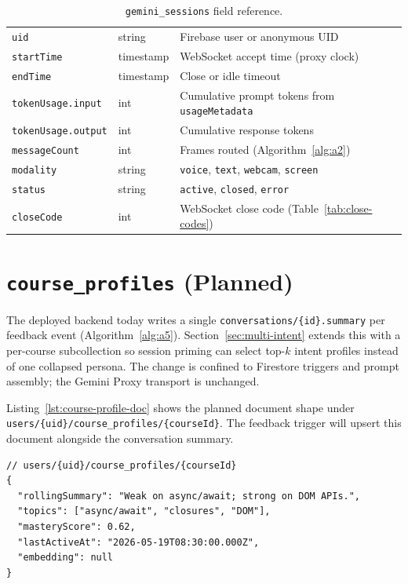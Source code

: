 \tablesetup
\begin{table}[H]
\centering
\caption{\texttt{gemini\_sessions} field reference.}
\label{tab:gemini-session-fields}
\small
\begin{tabular}{|p{3.0cm}|p{1.9cm}|p{8.3cm}|}
\hline
\chead{Field} & \chead{Type} & \chead{Semantics} \\
\hline
\texttt{uid} & string & Firebase user or anonymous UID \\
\texttt{startTime} & timestamp & WebSocket accept time (proxy clock) \\
\texttt{endTime} & timestamp & Close or idle timeout \\
\texttt{tokenUsage.input} & int & Cumulative prompt tokens from \texttt{usageMetadata} \\
\texttt{tokenUsage.output} & int & Cumulative response tokens \\
\texttt{messageCount} & int & Frames routed (Algorithm~\ref{alg:a2}) \\
\texttt{modality} & string & \texttt{voice}, \texttt{text}, \texttt{webcam}, \texttt{screen} \\
\texttt{status} & string & \texttt{active}, \texttt{closed}, \texttt{error} \\
\texttt{closeCode} & int & WebSocket close code (Table~\ref{tab:close-codes}) \\
\hline
\end{tabular}
\end{table}

\section{\texttt{course\_profiles} (Planned)}
\label{sec:course-profiles-impl}

The deployed backend today writes a single \texttt{conversations/\{id\}.summary} per feedback event (Algorithm~\ref{alg:a5}). Section~\ref{sec:multi-intent} extends this with a per-course subcollection so session priming can select top-$k$ intent profiles instead of one collapsed persona. The change is confined to Firestore triggers and prompt assembly; the Gemini Proxy transport is unchanged.

Listing~\ref{lst:course-profile-doc} shows the planned document shape under \texttt{users/\{uid\}/course\_profiles/\{courseId\}}. The feedback trigger will upsert this document alongside the conversation summary.

\begin{lstlisting}[caption={Planned Firestore document for \texttt{course\_profiles/\{courseId\}} (JSON).},label=lst:course-profile-doc]
// users/{uid}/course_profiles/{courseId}
{
  "rollingSummary": "Weak on async/await; strong on DOM APIs.",
  "topics": ["async/await", "closures", "DOM"],
  "masteryScore": 0.62,
  "lastActiveAt": "2026-05-19T08:30:00.000Z",
  "embedding": null
}
\end{lstlisting}

